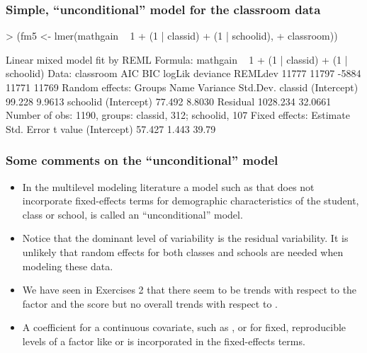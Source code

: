 \begin{frame}[fragile]
  \frametitle{Simple, ``unconditional'' model for the classroom data}
\begin{Schunk}
\begin{Sinput}
> (fm5 <- lmer(mathgain ~ 1 + (1 | classid) + (1 | schoolid), 
+     classroom))
\end{Sinput}
\begin{Soutput}
Linear mixed model fit by REML 
Formula: mathgain ~ 1 + (1 | classid) + (1 | schoolid) 
   Data: classroom 
   AIC   BIC logLik deviance REMLdev
 11777 11797  -5884    11771   11769
Random effects:
 Groups   Name        Variance Std.Dev.
 classid  (Intercept)   99.228  9.9613 
 schoolid (Intercept)   77.492  8.8030 
 Residual             1028.234 32.0661 
Number of obs: 1190, groups: classid, 312; schoolid, 107
Fixed effects:
            Estimate Std. Error t value
(Intercept)   57.427      1.443   39.79
\end{Soutput}
\end{Schunk}
\end{frame}

\begin{frame}
  \frametitle{Some comments on the ``unconditional'' model}
  \begin{itemize}
  \item In the multilevel modeling literature a model such as
     that does not incorporate fixed-effects terms for
    demographic characteristics of the student, class or school, is
    called an ``unconditional'' model.
  \item Notice that the dominant level of variability is the residual
    variability.  It is unlikely that random effects for both classes
    and schools are needed when modeling these data.
  \item We have seen in Exercises 2 that there seem to be trends with
    respect to the  factor and the 
    score but no overall trends with respect to .
  \item A coefficient for a continuous covariate, such as
    , or for fixed, reproducible levels of a factor
    like  or  is incorporated in the
    fixed-effects terms.
  \end{itemize}
\end{frame}

